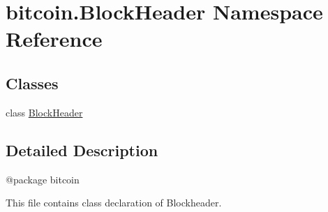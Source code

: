 \hypertarget{namespacebitcoin_1_1BlockHeader}{}\section{bitcoin.\+Block\+Header Namespace Reference}
\label{namespacebitcoin_1_1BlockHeader}
\subsection*{Classes}
\begin{DoxyCompactItemize}
\item 
class \hyperlink{classbitcoin_1_1BlockHeader_1_1BlockHeader}{Block\+Header}
\end{DoxyCompactItemize}


\subsection{Detailed Description}
\begin{DoxyVerb}@package bitcoin

This file contains class declaration of Blockheader.
\end{DoxyVerb}
 